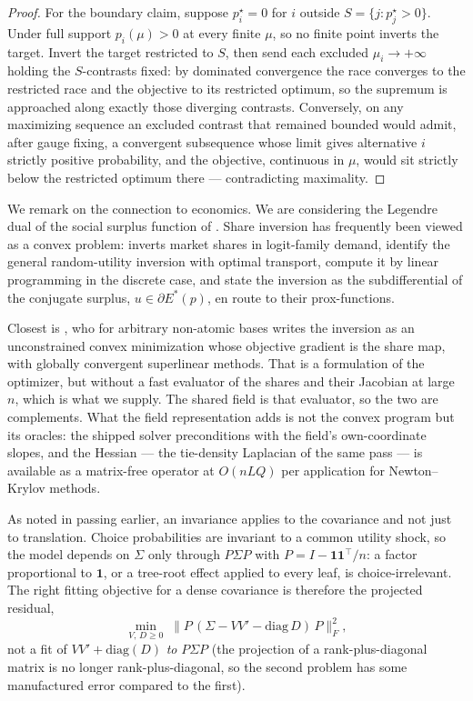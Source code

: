 \documentclass[11pt]{article}
\begin{document}
\begin{proof}
For the boundary claim, suppose $p^{\star}_i=0$ for $i$ outside
$S=\{j:p^{\star}_j>0\}$. Under full support $p_i(\mu)>0$ at every finite
$\mu$, so no finite point inverts the target. Invert the target
restricted to $S$, then send each excluded $\mu_i\to+\infty$ holding the
$S$-contrasts fixed: by dominated convergence the race converges to the
restricted race and the objective to its restricted optimum, so the
supremum is approached along exactly those diverging contrasts.
Conversely, on any maximizing sequence an excluded contrast that
remained bounded would admit, after gauge fixing, a convergent
subsequence whose limit gives alternative $i$ strictly positive
probability, and the objective, continuous in $\mu$, would sit strictly
below the restricted optimum there --- contradicting maximality.
\end{proof}

We remark on the connection to economics. We are considering the Legendre dual of the social surplus function of
\citet{mcfadden1981}. Share inversion has frequently been viewed as a convex problem: \citet{berry1994} inverts market shares in
logit-family demand, \citet{galichon2022} identify the general random-utility
inversion with optimal transport, \citet{chiong2016} compute it by
linear programming in the discrete case, and \citet{muller2022} state
the inversion as the subdifferential of the conjugate surplus,
$u\in\partial E^{*}(p)$, en route to their prox-functions.

Closest is
\citet{li2018}, who for arbitrary non-atomic bases writes the inversion
as an unconstrained convex minimization whose objective gradient is the
share map, with globally convergent superlinear methods. That is a formulation
of the optimizer, but without a fast evaluator of the shares
and their Jacobian at large $n$, which is what we supply. The shared field is that evaluator, so
the two are complements. What the field representation adds is not the
convex program but its oracles: the shipped solver preconditions with
the field's own-coordinate slopes, and the Hessian --- the tie-density
Laplacian of the same pass --- is available as a matrix-free operator at
$O(nLQ)$ per application for Newton--Krylov methods.

As noted in passing earlier, an invariance applies to the covariance and
not just to translation. Choice probabilities are
invariant to a common utility shock, so the model depends on $\Sigma$ only
through $P\Sigma P$ with $P=I-\mathbf{1}\mathbf{1}^{\top}/n$: a factor
proportional to $\mathbf{1}$, or a tree-root effect applied to every leaf,
is choice-irrelevant. The right fitting objective for a dense covariance
is therefore the projected residual,
\[
\min_{V,\,D\ge0}\;\bigl\lVert P\,(\Sigma-VV'-\mathrm{diag}\,D)\,P\bigr\rVert_F^2,
\]
not a fit of $VV'+\mathrm{diag}(D)$ \emph{to} $P\Sigma P$ (the projection
of a rank-plus-diagonal matrix is no longer rank-plus-diagonal, so the
second problem has some manufactured error compared to the first).
\end{document}
